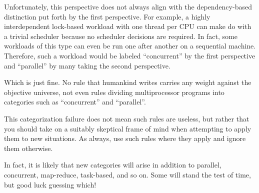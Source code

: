 Unfortunately, this perspective does not always align with the
dependency-based distinction put forth by the first perspective.
For example, a highly interdependent lock-based workload
with one thread per CPU can make do with a trivial scheduler
because no scheduler decisions are required.
In fact, some workloads of this type can even be run one after another
on a sequential machine.
Therefore, such a workload would be labeled ``concurrent'' by the first
perspective and ``parallel'' by many taking the second perspective.

\QuickQuizEnd

Which is just fine.
No rule that humankind writes carries any weight against the objective
universe, not even rules dividing multiprocessor programs into categories
such as ``concurrent'' and ``parallel''.

This categorization failure does not mean such rules are useless,
but rather that you should take on a suitably skeptical frame of mind when
attempting to apply them to new situations.
As always, use such rules where they apply and ignore them otherwise.

In fact, it is likely that new categories will arise in addition
to parallel, concurrent, map-reduce, task-based, and so on.
Some will stand the test of time, but good luck guessing which!
